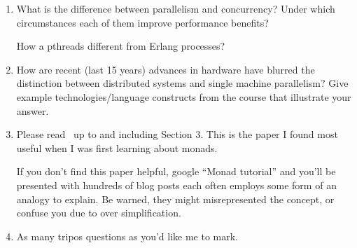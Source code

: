\begin{enumerate}
  \item What is the difference between parallelism and concurrency? Under which
    circumstances each of them improve performance benefits?

    How a pthreads different from Erlang processes?

  \item How are recent (last 15 years) advances in hardware have blurred the
    distinction between distributed systems and single machine parallelism?
    Give example technologies/language constructs from the course that
    illustrate your answer.

  \item Please read~\citet{wadler1995monads} up to and including Section 3.
    This is the paper I found most useful when I was first learning about
    monads.

    If you don't find this paper helpful, google ``Monad tutorial'' and
    you'll be presented with hundreds of blog posts each often employs some
    form of an analogy to explain. Be warned, they might misrepresented the
    concept, or confuse you due to over simplification.

  \item As many tripos questions as you’d like me to mark.

\end{enumerate}


